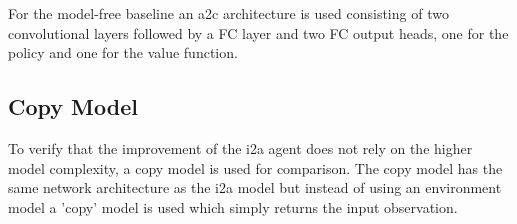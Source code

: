 For the model-free baseline an a2c architecture is used consisting of two convolutional layers followed by a FC layer and two FC output heads, one for the policy and one for the value function.\\

\subsection{Copy Model}

To verify that the improvement of the i2a agent does not rely on the higher model complexity, a copy model is used for comparison. The copy model has the same network architecture as the i2a model but instead of using an environment model a 'copy' model is used which simply returns the input observation. 